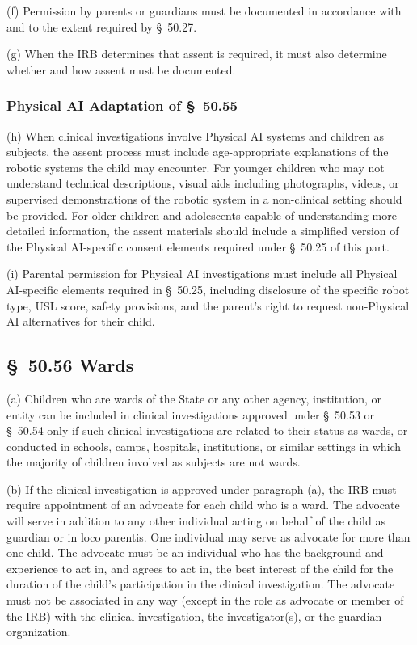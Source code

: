 \documentclass[11pt]{article}
\begin{document}
(f) Permission by parents or guardians must be documented in accordance with and to the extent required by \S~50.27.

(g) When the IRB determines that assent is required, it must also determine whether and how assent must be documented.

\subsubsection{Physical AI Adaptation of \S~50.55}

(h) When clinical investigations involve Physical AI systems and children as subjects, the assent process must include age-appropriate explanations of the robotic systems the child may encounter. For younger children who may not understand technical descriptions, visual aids including photographs, videos, or supervised demonstrations of the robotic system in a non-clinical setting should be provided. For older children and adolescents capable of understanding more detailed information, the assent materials should include a simplified version of the Physical AI-specific consent elements required under \S~50.25 of this part.

(i) Parental permission for Physical AI investigations must include all Physical AI-specific elements required in \S~50.25, including disclosure of the specific robot type, USL score, safety provisions, and the parent's right to request non-Physical AI alternatives for their child.

\subsection{\S~50.56 Wards}

(a) Children who are wards of the State or any other agency, institution, or entity can be included in clinical investigations approved under \S~50.53 or \S~50.54 only if such clinical investigations are related to their status as wards, or conducted in schools, camps, hospitals, institutions, or similar settings in which the majority of children involved as subjects are not wards.

(b) If the clinical investigation is approved under paragraph (a), the IRB must require appointment of an advocate for each child who is a ward. The advocate will serve in addition to any other individual acting on behalf of the child as guardian or in loco parentis. One individual may serve as advocate for more than one child. The advocate must be an individual who has the background and experience to act in, and agrees to act in, the best interest of the child for the duration of the child's participation in the clinical investigation. The advocate must not be associated in any way (except in the role as advocate or member of the IRB) with the clinical investigation, the investigator(s), or the guardian organization.
\end{document}
